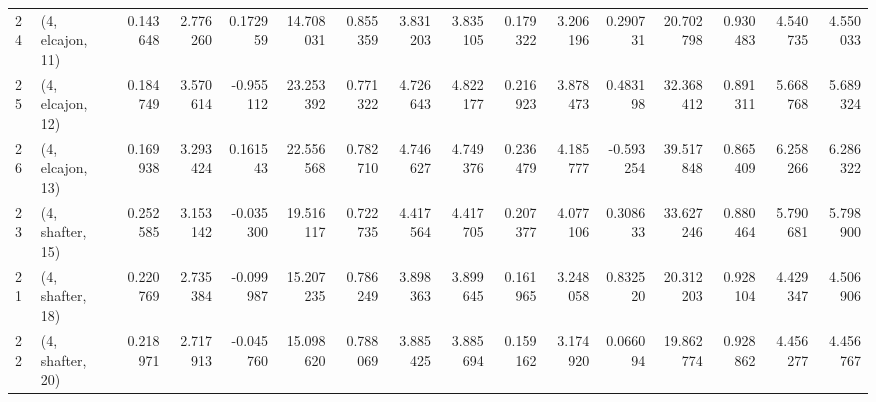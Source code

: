 \begin{tabular}{llrrrrrrrrrrrrrr}
24 &  (4, elcajon, 11) &   0.143648 &  2.776260 &  0.172959 &   14.708031 &  0.855359 &   3.831203 &   3.835105 &  0.179322 &  3.206196 &  0.290731 &   20.702798 &  0.930483 &   4.540735 &   4.550033 \\
25 &  (4, elcajon, 12) &   0.184749 &  3.570614 & -0.955112 &   23.253392 &  0.771322 &   4.726643 &   4.822177 &  0.216923 &  3.878473 &  0.483198 &   32.368412 &  0.891311 &   5.668768 &   5.689324 \\
26 &  (4, elcajon, 13) &   0.169938 &  3.293424 &  0.161543 &   22.556568 &  0.782710 &   4.746627 &   4.749376 &  0.236479 &  4.185777 & -0.593254 &   39.517848 &  0.865409 &   6.258266 &   6.286322 \\
23 &  (4, shafter, 15) &   0.252585 &  3.153142 & -0.035300 &   19.516117 &  0.722735 &   4.417564 &   4.417705 &  0.207377 &  4.077106 &  0.308633 &   33.627246 &  0.880464 &   5.790681 &   5.798900 \\
21 &  (4, shafter, 18) &   0.220769 &  2.735384 & -0.099987 &   15.207235 &  0.786249 &   3.898363 &   3.899645 &  0.161965 &  3.248058 &  0.832520 &   20.312203 &  0.928104 &   4.429347 &   4.506906 \\
22 &  (4, shafter, 20) &   0.218971 &  2.717913 & -0.045760 &   15.098620 &  0.788069 &   3.885425 &   3.885694 &  0.159162 &  3.174920 &  0.066094 &   19.862774 &  0.928862 &   4.456277 &   4.456767 \\
\bottomrule
\end{tabular}
